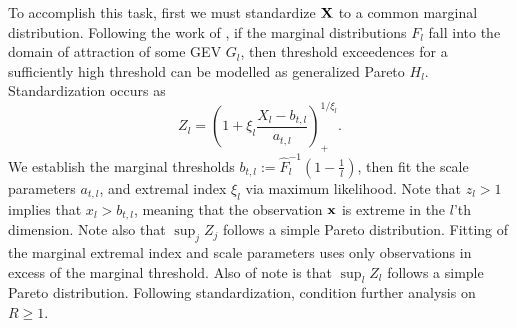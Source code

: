To accomplish this task, first we must standardize ${\bf X}$ to a common marginal distribution.
  Following the work of \cite{ferreira2014}, if the marginal distributions $F_{l}$ fall into the domain
  of attraction of some GEV $G_l$, then threshold exceedences for a sufficiently high threshold can
  be modelled as generalized Pareto $H_l$.  Standardization occurs as
  \begin{equation}
    Z_l = \left(1 + \xi_l\frac{X_l - b_{t,l}}{a_{t,l}}\right)_{+}^{1/\xi_l}.
  \end{equation}
  We establish the marginal thresholds $b_{t,l} := \hat{F}_l^{-1}\left(1 - \frac{1}{l}\right)$,
  then fit the scale parameters $a_{t,l}$, and extremal index $\xi_l$ via maximum likelihood.
  Note that $z_l > 1$ implies that $x_l > b_{t,l}$, meaning that the observation ${\bf x}$ is
  extreme in the $l$'th dimension.  Note also that $\sup_j Z_j$ follows a simple Pareto distribution.
  Fitting of the marginal extremal index and scale parameters uses only observations in excess of the
  marginal threshold.  Also of note is that $\sup_l Z_l$ follows a simple Pareto distribution.
  Following standardization, condition further analysis on $R \geq 1$.


